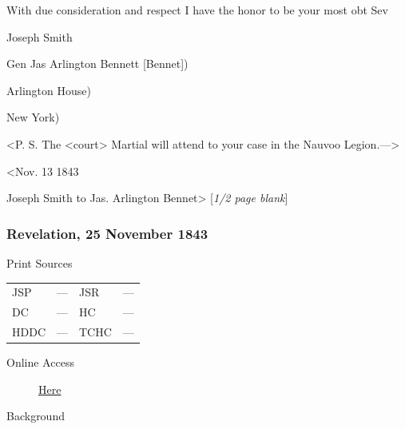 				\begin{tightright}
					With due consideration and respect I have the honor to be your most obt Sev

					Joseph Smith
				\end{tightright}

				Gen Jas Arlington Bennett [Bennet])

				Arlington House)

				New York)

				<P. S. The <court> Martial will attend to your case in the Nauvoo Legion.--->

				<Nov. 13 1843

				Joseph Smith to Jas. Arlington Bennet> [\textit{1/2 page blank}]
				
		\subsubsection{Revelation, 25 November 1843}
			\label{EMS-1843-JS-25-NOV-1843}
			
			\begin{description}
				\item[Print Sources]
			\end{description}

				\begin{tabular}{p{0.5in}p{1in}p{0.5in}p{1in}}
				JSP	 	& ---		& JSR 		& --- \\
				DC	 	& ---		& HC 		& --- \\
				HDDC 	& ---		& TCHC 		& --- \\
				\end{tabular}
			
			\begin{description}
				\item[Online Access] \href{https://www.josephsmithpapers.org/paper-summary/revelation-25-november-1843/1}{Here}
			\end{description}
			
			\begin{description}
				\item[Background]
			\end{description}
			
			
